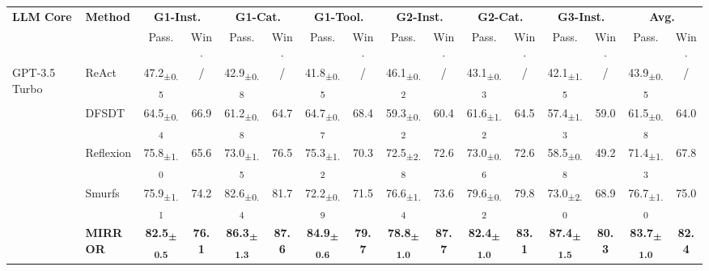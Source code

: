 \documentclass{article}
\begin{document}
\begin{table}[t]
\centering
\footnotesize
\begin{adjustbox}{width=0.98\textwidth}
\setlength{\tabcolsep}{4pt}
\begin{tabular}{@{}ll|cc|cc|cc|cc|cc|cc|cc@{}}
\toprule
\textbf{LLM Core} & \textbf{Method} & \multicolumn{2}{c|}{\textbf{G1-Inst.}} & \multicolumn{2}{c|}{\textbf{G1-Cat.}} & \multicolumn{2}{c|}{\textbf{G1-Tool.}} & \multicolumn{2}{c|}{\textbf{G2-Inst.}} & \multicolumn{2}{c|}{\textbf{G2-Cat.}} & \multicolumn{2}{c|}{\textbf{G3-Inst.}} & \multicolumn{2}{c}{\textbf{Avg.}} \\
 &  & Pass. & Win. & Pass. & Win. & Pass. & Win. & Pass. & Win. & Pass. & Win. & Pass. & Win. & Pass. & Win. \\
\midrule
\multirow{5}{*}{GPT-3.5 Turbo} & ReAct & 47.2\textsubscript{±0.5}& / & 42.9\textsubscript{±0.8}& / & 41.8\textsubscript{±0.5}& / & 46.1\textsubscript{±0.2}& / & 43.1\textsubscript{±0.3}& / & 42.1\textsubscript{±1.5}& / & 43.9\textsubscript{±0.5}& / \\
 & DFSDT & 64.5\textsubscript{±0.4}& 66.9 & 61.2\textsubscript{±0.8}& 64.7 & 64.7\textsubscript{±0.7}& 68.4 & 59.3\textsubscript{±0.2}& 60.4 & 61.6\textsubscript{±1.2}& 64.5 & 57.4\textsubscript{±1.3}& 59.0 & 61.5\textsubscript{±0.8}& 64.0 \\
 & Reflexion & 75.8\textsubscript{±1.0}& 65.6 & 73.0\textsubscript{±1.5}& 76.5 & 75.3\textsubscript{±1.2}& 70.3 & 72.5\textsubscript{±2.8}& 72.6 & 73.0\textsubscript{±0.6}& 72.6 & 58.5\textsubscript{±0.8}& 49.2 & 71.4\textsubscript{±1.3}& 67.8 \\
 & Smurfs & 75.9\textsubscript{±1.1}& 74.2 & 82.6\textsubscript{±0.4}& 81.7 & 72.2\textsubscript{±0.9}& 71.5 & 76.6\textsubscript{±1.4}& 73.6 & 79.6\textsubscript{±0.2}& 79.8 & 73.0\textsubscript{±2.0}& 68.9 & 76.7\textsubscript{±1.0}& 75.0 \\
 &\cellcolor{green!18}\textbf{MIRROR}&\cellcolor{green!18}\textbf{82.5\textsubscript{±0.5}}& \cellcolor{green!18}\textbf{76.1} &\cellcolor{green!18}\textbf{86.3\textsubscript{±1.3}}& \cellcolor{green!18}\textbf{87.6} & \cellcolor{green!18}\textbf{84.9\textsubscript{±0.6}}& \cellcolor{green!18}\textbf{79.7} & \cellcolor{green!18}\textbf{78.8\textsubscript{±1.0}}& \cellcolor{green!18}\textbf{87.7} & \cellcolor{green!18}\textbf{82.4\textsubscript{±1.0}}& \cellcolor{green!18}\textbf{83.1} & \cellcolor{green!18}\textbf{87.4\textsubscript{±1.5}}& \cellcolor{green!18}\textbf{80.3} & \cellcolor{green!18}\textbf{83.7\textsubscript{±1.0}}& \cellcolor{green!18}\textbf{82.4} \\

\end{tabular}
\end{adjustbox}
\end{table}
\end{document}
